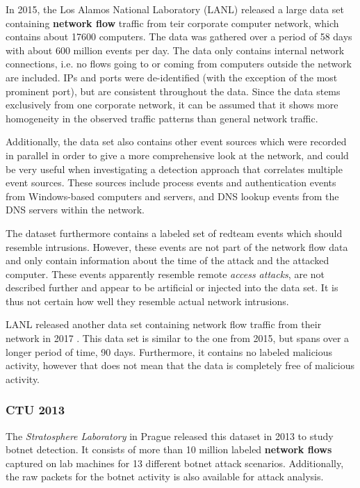\documentclass[a4paper,12pt,twoside]{report}
\begin{document}
In 2015, the Los Alamos National Laboratory (LANL) released a large data set containing \textbf{network flow} traffic from teir corporate computer network, which contains about 17600 computers. The data was gathered over a period of 58 days with about 600 million events per day. The data only contains internal network connections, i.e. no flows going to or coming from computers outside the network are included. IPs and ports were de-identified (with the exception of the most prominent port), but are consistent throughout the data. Since the data stems exclusively from one corporate network, it can be assumed that it shows more homogeneity in the observed traffic patterns than  general network traffic.

Additionally, the data set also contains other event sources which were recorded in parallel in order to give a more comprehensive look at the network, and could be very useful when investigating a detection approach that correlates multiple event sources. These sources include process events and authentication events from Windows-based computers and servers, and DNS lookup events from the DNS servers within the network. 

The dataset furthermore contains a labeled set of redteam events which should resemble intrusions. However, these events are not part of the network flow data and only contain information about the time of the attack and the attacked computer. These events apparently resemble remote \textit{access attacks}, are not described further and appear to be artificial or injected into the data set. It is thus not certain how well they resemble actual network intrusions.


LANL released another data set containing network flow traffic from their network in 2017 \cite{turcotte17}. This data set is similar to the one from 2015, but spans over a longer period of time, 90 days. Furthermore, it contains no labeled malicious activity,  however that does not mean that the data is completely free of malicious activity.

\subsubsection*{CTU 2013 \cite{noauthor_ctu-13_nodate, garcia2014empirical}}

The \textit{Stratosphere Laboratory} in Prague released this dataset in 2013 to study botnet detection. It consists of more than 10 million labeled \textbf{network flows} captured on lab machines for 13 different botnet attack scenarios. Additionally, the raw packets for the botnet activity is also available for attack analysis. 
\end{document}
